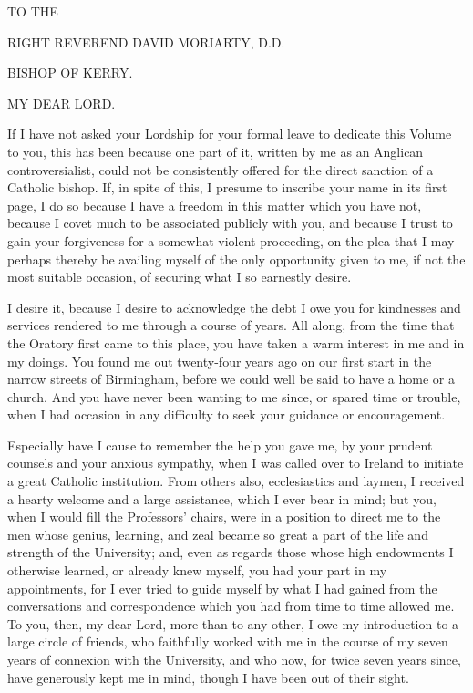 



TO THE

RIGHT REVEREND DAVID MORIARTY, D.D.

BISHOP OF KERRY.


MY DEAR LORD.

If I have not asked your Lordship for your formal leave to
dedicate this Volume to you, this has been because one part of it,
written by me as an Anglican controversialist, could not be
consistently offered for the direct sanction of a Catholic bishop. If,
in spite of this, I presume to inscribe your name in its first page, I
do so because I have a freedom in this matter which you have not,
because I covet much to be associated publicly with you, and because I
trust to gain your forgiveness for a somewhat violent proceeding, on
the plea that I may perhaps thereby be availing myself of the only
opportunity given to me, if not the most suitable occasion, of
securing what I so earnestly desire.


I desire it, because I desire to acknowledge the debt I owe you for
kindnesses and services rendered to me through a course of years. All
along, from the time that the Oratory first came to this place, you
have taken a warm interest in me and in my doings. You found me
out twenty-four years ago on our first start in the narrow streets of
Birmingham, before we could well be said to have a home or a church.
And you have never been wanting to me since, or spared time or
trouble, when I had occasion in any difficulty to seek your guidance
or encouragement.


Especially have I cause to remember the help you gave me, by your
prudent counsels and your anxious sympathy, when I was called over to
Ireland to initiate a great Catholic institution. From others also,
ecclesiastics and laymen, I received a hearty welcome and a large
assistance, which I ever bear in mind; but you, when I would fill the
Professors' chairs, were in a position to direct me to the men whose
genius, learning, and zeal became so great a part of the life and
strength of the University; and, even as regards those whose high
endowments I otherwise learned, or already knew myself, you had your
part in my appointments, for I ever tried to guide myself by what I
had gained from the conversations and correspondence which you had
from time to time allowed me. To you, then, my dear Lord, more than to
any other, I owe my introduction to a large circle of friends, who
faithfully worked with me in the course of my seven years of connexion
with the University, and who now, for twice seven years since, have
generously kept me in mind, though I have been out of their sight.


